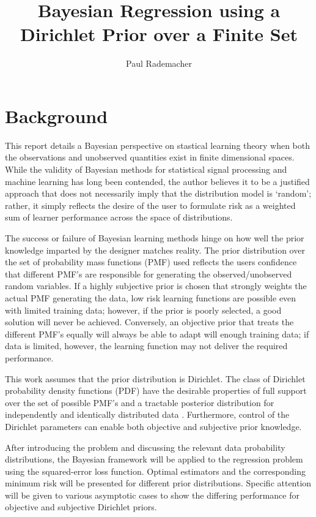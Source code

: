 \documentclass[12pt]{article}
\title{Bayesian Regression using a Dirichlet Prior over a Finite Set}
\author{Paul Rademacher}
\begin{document}
\maketitle




\section{Background}

This report details a Bayesian perspective on stastical learning theory when both the observations and unobserved quantities exist in finite dimensional spaces. While the validity of Bayesian methods for statistical signal processing and machine learning has long been contended, the author believes it to be a justified approach that does not necessarily imply that the distribution model is `random'; rather, it simply reflects the desire of the user to formulate risk as a weighted sum of learner performance across the space of distributions. 

The success or failure of Bayesian learning methods hinge on how well the prior knowledge imparted by the designer matches reality. The prior distribution over the set of probability mass functions (PMF) used reflects the users confidence that different PMF's are responsible for generating the observed/unobserved random variables. If a highly subjective prior is chosen that strongly weights the actual PMF generating the data, low risk learning functions are possible even with limited training data; however, if the prior is poorly selected, a good solution will never be achieved. Conversely, an objective prior that treats the different PMF's equally will always be able to adapt will enough training data; if data is limited, however, the learning function may not deliver the required performance.

This work assumes that the prior distribution is Dirichlet. The class of Dirichlet probability density functions (PDF) have the desirable properties of full support over the set of possible PMF's and a tractable posterior distribution for independently and identically distributed data \cite{ferguson}. Furthermore, control of the Dirichlet parameters can enable both objective and subjective prior knowledge.

After introducing the problem and discussing the relevant data probability distributions, the Bayesian framework will be applied to the regression problem using the squared-error loss function. Optimal estimators and the corresponding minimum risk will be presented for different prior distributions. Specific attention will be given to various asymptotic cases to show the differing performance for objective and subjective Dirichlet priors.
\end{document}
